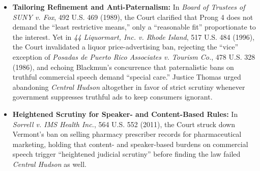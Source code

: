 \documentclass[12pt]{article}
\begin{document}
\begin{itemize}
  \item \textbf{Tailoring Refinement and Anti-Paternalism:} In \textit{Board of Trustees of SUNY v. Fox}, 492 U.S. 469 (1989), the Court clarified that Prong 4 does not demand the ``least restrictive means,'' only a ``reasonable fit'' proportionate to the interest. Yet in \textit{44 Liquormart, Inc. v. Rhode Island}, 517 U.S. 484 (1996), the Court invalidated a liquor price-advertising ban, rejecting the ``vice'' exception of \textit{Posadas de Puerto Rico Associates v. Tourism Co.}, 478 U.S. 328 (1986), and echoing Blackmun's concurrence that paternalistic bans on truthful commercial speech demand ``special care.'' Justice Thomas urged abandoning \textit{Central Hudson} altogether in favor of strict scrutiny whenever government suppresses truthful ads to keep consumers ignorant.
  \item \textbf{Heightened Scrutiny for Speaker- and Content-Based Rules:} In \textit{Sorrell v. IMS Health Inc.}, 564 U.S. 552 (2011), the Court struck down Vermont's ban on selling pharmacy prescriber records for pharmaceutical marketing, holding that content- and speaker-based burdens on commercial speech trigger ``heightened judicial scrutiny'' before finding the law failed \textit{Central Hudson} as well.

\end{itemize}
\end{document}
